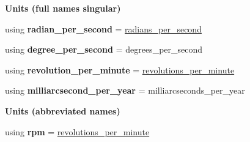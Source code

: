 \begin{Indent}{\bf Units (full names singular)}\par
\begin{DoxyCompactItemize}
\item 
\hypertarget{namespaceunits_1_1angular__velocity_a8796a39eb52678f43729411b753e4e3b}{}using {\bfseries radian\+\_\+per\+\_\+second} = \hyperlink{structunits_1_1unit}{radians\+\_\+per\+\_\+second}\label{namespaceunits_1_1angular__velocity_a8796a39eb52678f43729411b753e4e3b}

\item 
\hypertarget{namespaceunits_1_1angular__velocity_a47b5e40b0a76921759f28a148a0109f5}{}using {\bfseries degree\+\_\+per\+\_\+second} = degrees\+\_\+per\+\_\+second\label{namespaceunits_1_1angular__velocity_a47b5e40b0a76921759f28a148a0109f5}

\item 
\hypertarget{namespaceunits_1_1angular__velocity_a366f223c6f120a378a5a6e9a7da9680f}{}using {\bfseries revolution\+\_\+per\+\_\+minute} = \hyperlink{structunits_1_1unit}{revolutions\+\_\+per\+\_\+minute}\label{namespaceunits_1_1angular__velocity_a366f223c6f120a378a5a6e9a7da9680f}

\item 
\hypertarget{namespaceunits_1_1angular__velocity_ab8ae181602819d7a003fba91d1bc0173}{}using {\bfseries milliarcsecond\+\_\+per\+\_\+year} = milliarcseconds\+\_\+per\+\_\+year\label{namespaceunits_1_1angular__velocity_ab8ae181602819d7a003fba91d1bc0173}

\end{DoxyCompactItemize}
\end{Indent}
\begin{Indent}{\bf Units (abbreviated names)}\par
\begin{DoxyCompactItemize}
\item 
\hypertarget{namespaceunits_1_1angular__velocity_ae654df8e583bb8f946bb36878f483b45}{}using {\bfseries rpm} = \hyperlink{structunits_1_1unit}{revolutions\+\_\+per\+\_\+minute}\label{namespaceunits_1_1angular__velocity_ae654df8e583bb8f946bb36878f483b45}

\end{DoxyCompactItemize}
\end{Indent}
